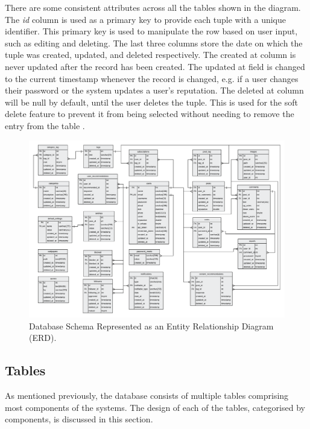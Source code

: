 There are some consistent attributes across all the tables shown in the diagram. The \textsl{id} column is used as a primary key to provide each tuple with a unique identifier. This primary key is used to manipulate the row based on user input, such as editing and deleting. The last three columns store the date on which the tuple was created, updated, and deleted respectively. The created at column is never updated after the record has been created. The updated at field is changed to the current timestamp whenever the record is changed, e.g. if a user changes their password or the system updates a user's reputation. The deleted at column will be null by default, until the user deletes the tuple. This is used for the soft delete feature to prevent it from being selected without needing to remove the entry from the table \cite{PCMEncyclopedia:SoftDelete}.

\begin{figure}[H]
  \centering
  \includegraphics[width=1.0\textwidth]{Images/Design/Database/ERD}
  \caption{Database Schema Represented as an Entity Relationship Diagram (ERD).} \label{fig:Database_ERD}
\end{figure}

\subsection{Tables}
\label{SubSection:Database_Tables}
As mentioned previously, the database consists of multiple tables comprising most components of the systems. The design of each of the tables, categorised by components, is discussed in this section.

